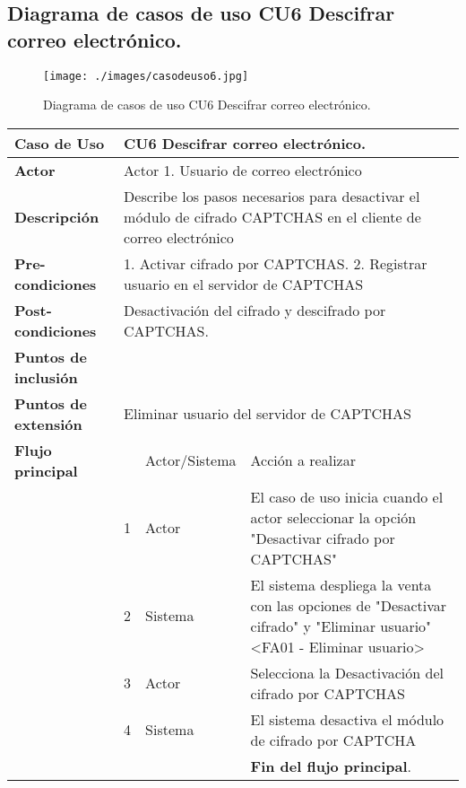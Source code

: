 \documentclass[12pt,oneside,onecolumn,openany]{report}
\begin{document}
\subsection{Diagrama de casos de uso CU6 Descifrar correo electrónico.}
\begin{figure}[H]
	\texttt{[image: ./images/casodeuso6.jpg]}
	\caption{Diagrama de casos de uso CU6 Descifrar correo electrónico.}
	\label{fig:4-7-1}
\end{figure}
\begin{longtable}[H]{| p{} | p{} |p{4cm}|p{5cm}|}
     \hline
     \textbf{Caso de Uso} &\multicolumn{3}{|l|}{CU6 Descifrar correo electrónico.}\\
     \hline
     \textbf{Actor} & \multicolumn{3}{|l|}{Actor 1. Usuario de correo electrónico}\\
     \hline
     \textbf{Descripción} & \multicolumn{3}{|p{10cm}|}{Describe los pasos necesarios para desactivar el módulo de cifrado CAPTCHAS en el cliente de correo electrónico}\\
     \hline
     \textbf{Pre-condiciones} & \multicolumn{3}{|p{10cm}|}{1. Activar cifrado por CAPTCHAS. 2. Registrar usuario en el servidor de CAPTCHAS}\\
     \hline
     \textbf{Post-condiciones} & \multicolumn{3}{|l|}{Desactivación del cifrado y descifrado por CAPTCHAS.}\\
     \hline
     \textbf{Puntos de inclusión} & \multicolumn{3}{|l|}{}\\
     \hline
     \textbf{Puntos de extensión} & \multicolumn{3}{|l|}{Eliminar usuario del servidor de CAPTCHAS}\\
     \hline
     \textbf{Flujo principal} & & Actor/Sistema & Acción a realizar\\
     \hline
     & 1 & Actor & El caso de uso inicia cuando el actor seleccionar la opción "Desactivar cifrado por CAPTCHAS"\\
     \hline
     & 2 & Sistema & El sistema despliega la venta con las opciones de "Desactivar cifrado" y "Eliminar usuario" <FA01 - Eliminar usuario>\\
     \hline
     & 3 & Actor & Selecciona la Desactivación del cifrado por CAPTCHAS\\
     \hline
     & 4 & Sistema & El sistema desactiva el módulo de cifrado por CAPTCHA\\
     \hline
     & & & \textbf{Fin del flujo principal}.\\

\end{longtable}
\end{document}
